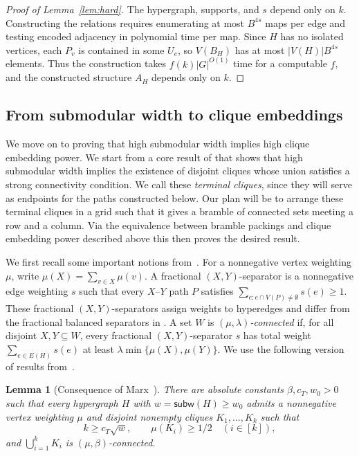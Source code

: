 \documentclass[11pt,letterpaper]{article}
\newtheorem{lemma}[lemma]{Lemma}
\theoremstyle{definition}
\theoremstyle{remark}
\newcommand{\subw}{\mathsf{subw}}
\providecommand{\subw}{\operatorname{subw}}
\begin{document}
\begin{proof}[Proof of Lemma~\ref{lem:hard}]
The hypergraph, supports, and $s$ depend only on $k$. Constructing the relations
requires enumerating at most $B^{4s}$ maps per edge and testing encoded
adjacency in polynomial time per map. Since $H$ has no isolated vertices,
each $P_v$ is contained in some $U_e$, so $V(B_H)$ has at most
$|V(H)|B^{4s}$ elements. Thus the construction takes
$f(k)|G|^{O(1)}$ time for a computable $f$, and the constructed structure
$A_H$ depends only on $k$.
\end{proof}

\subsection{From submodular width to clique embeddings}
\label{sec:structural}

We move on to proving that high submodular width implies high clique embedding power. We start from a core result of \cite{Marx13} that shows that high submodular width implies the existence of disjoint cliques whose union satisfies a strong connectivity condition. We call these \emph{terminal cliques}, since they will serve as endpoints for the paths constructed below. Our plan will be to arrange these terminal cliques in a grid such that it gives a bramble of connected sets meeting a row and a column. Via the equivalence between bramble packings and clique embedding power described above this then proves the desired result.

We first recall some important notions from~\cite{Marx13}.
For a nonnegative vertex weighting $\mu$, write $\mu(X)=\sum_{v\in X}\mu(v)$.
A fractional $(X,Y)$-separator is a
nonnegative edge weighting $s$ such that every $X$--$Y$ path $P$ satisfies
$\sum_{e:e\cap V(P)\ne\emptyset}s(e)\ge1$.
These fractional $(X,Y)$-separators assign weights to hyperedges and differ from the fractional balanced separators in .
A set $W$ is \emph{$(\mu,\lambda)$-connected} if, for all disjoint
$X,Y\subseteq W$, every fractional $(X,Y)$-separator $s$ has total weight
$\sum_{e\in E(H)}s(e)$ at least
$\lambda\min\{\mu(X),\mu(Y)\}$.
%
We use the following version of results from~\cite{Marx13}.

\begin{lemma}[Consequence of Marx~{\cite[Theorem 5.1 and Lemma 6.5]{Marx13}}]
\label{lem:marx-cliques}
There are absolute constants $\beta,c_T,w_0>0$ such that every hypergraph
$H$ with $w=\subw(H)\ge w_0$ admits a nonnegative vertex weighting
$\mu$ and disjoint nonempty cliques $K_1,\ldots,K_k$ such that
\[
 k\ge c_T\sqrt w,\qquad \mu(K_i)\ge1/2\quad(i\in[k]),
\]
and $\bigcup_{i=1}^kK_i$ is $(\mu,\beta)$-connected.
\end{lemma}
\end{document}
